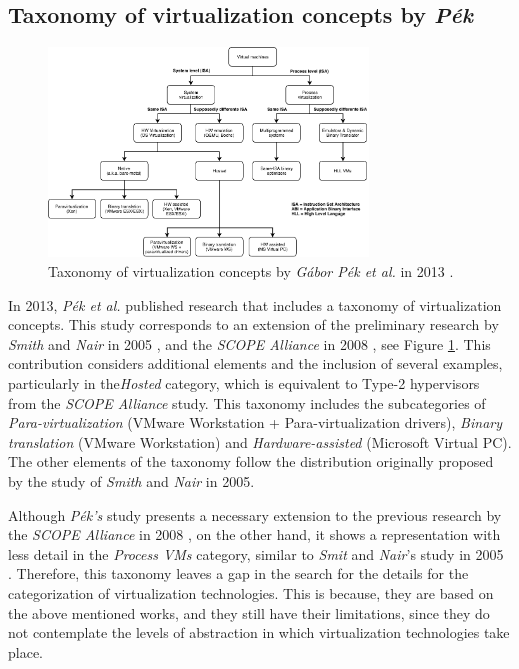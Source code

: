 	\subsection{Taxonomy of virtualization concepts by \textit{P{\'e}k}}
	
	\begin{figure}[H]
		\centering
		\includegraphics[width=8.5cm]{images/Pek2013.pdf}
		\vspace{-0.2cm}
		\caption{Taxonomy of virtualization concepts by \textit{G{\'a}bor P{\'e}k et al.} in 2013 \cite{Pek2013}.}
		\label{fig:TaxonomyOfVirtualizationConcepts}
	\end{figure}
	
	In 2013, \textit{P{\'e}k et al.} \cite{Pek2013} published research that includes a taxonomy of virtualization concepts. This study corresponds to an extension of the preliminary research by \textit{Smith} and \textit{Nair} in 2005 \cite{Smith2005}, and the \textit{SCOPE Alliance} in 2008 \cite {SCOPEAlliance2008}, see Figure \ref{fig:TaxonomyOfVirtualizationConcepts}. This contribution considers additional elements and the inclusion of several examples, particularly in the\textit{Hosted} category, which is equivalent to Type-2 hypervisors from the \textit{SCOPE Alliance} study. This taxonomy includes the subcategories of \textit{Para-virtualization} (VMware Workstation + Para-virtualization drivers), \textit{Binary translation} (VMware Workstation) and \textit{Hardware-assisted} (Microsoft Virtual PC). The other elements of the taxonomy follow the distribution originally proposed by the study of \textit{Smith} and \textit {Nair} in 2005. 
	
	Although \textit{P{\'e}k's} study presents a necessary extension to the previous research by the \textit{SCOPE Alliance} in 2008 \cite{SCOPEAlliance2008}, on the other hand, it shows a representation with less detail in the \textit{Process VMs} category, similar to \textit{Smit} and \textit{Nair}'s study in 2005 \cite{Smith2005}. Therefore, this taxonomy leaves a gap in the search for the details for the categorization of virtualization technologies. This is because, they are based on the above mentioned works, and they still have their limitations, since they do not contemplate the levels of abstraction in which virtualization technologies take place.